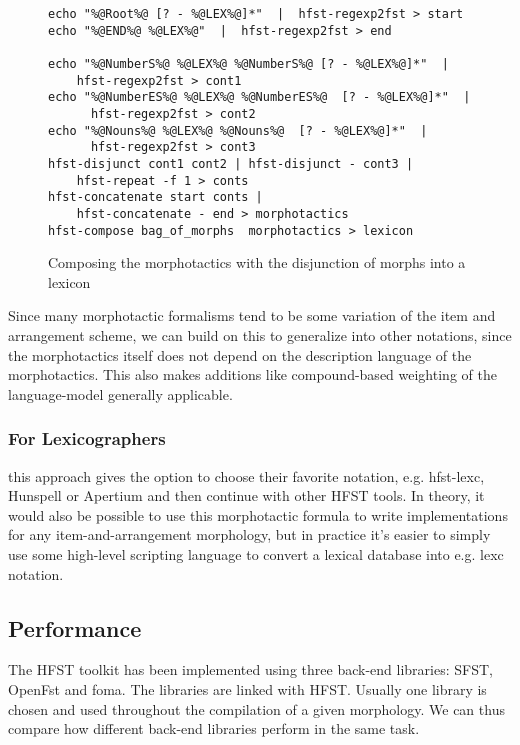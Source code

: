 \documentclass{llncs}
\begin{document}
\begin{figure} [h!]
{\footnotesize
\begin{verbatim}
echo "%@Root%@ [? - %@LEX%@]*"  |  hfst-regexp2fst > start
echo "%@END%@ %@LEX%@"  |  hfst-regexp2fst > end

echo "%@NumberS%@ %@LEX%@ %@NumberS%@ [? - %@LEX%@]*"  |
    hfst-regexp2fst > cont1
echo "%@NumberES%@ %@LEX%@ %@NumberES%@  [? - %@LEX%@]*"  |
      hfst-regexp2fst > cont2
echo "%@Nouns%@ %@LEX%@ %@Nouns%@  [? - %@LEX%@]*"  |
      hfst-regexp2fst > cont3
hfst-disjunct cont1 cont2 | hfst-disjunct - cont3 |
    hfst-repeat -f 1 > conts
hfst-concatenate start conts |
    hfst-concatenate - end > morphotactics
hfst-compose bag_of_morphs  morphotactics > lexicon
\end{verbatim}
}
\caption{Composing the morphotactics with the disjunction of morphs into a lexicon}
\label{fig:morphology2}
\end{figure}

Since many morphotactic formalisms tend to be some variation of the item and arrangement scheme,
we can build on this to generalize into other notations, since the morphotactics itself
does not depend on the description language of the morphotactics. 
This also makes additions like compound-based weighting of the language-model 
\cite{linden/2009/fsmnlp} generally applicable.

\subsubsection{For Lexicographers} this approach gives the option to
choose their favorite notation, e.g. hfst-lexc, Hunspell or Apertium and then continue with other
HFST tools. In theory, it would also be possible to use this morphotactic formula
to write implementations for any item-and-arrangement morphology, but in practice
it's easier to simply use some high-level scripting language to convert a lexical database into 
e.g. lexc notation.

\subsection{Performance}

The HFST toolkit has been implemented using three back-end libraries:
SFST, OpenFst and foma. The libraries are linked with HFST. Usually one library is chosen
and used throughout the compilation of a given morphology.
We can thus compare how different back-end libraries perform
in the same task.
\end{document}
